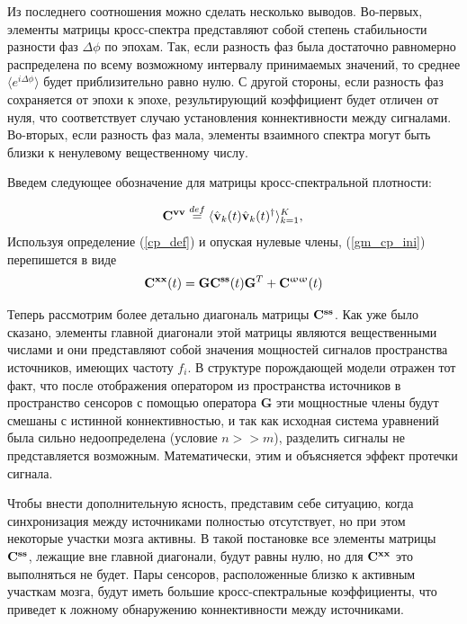 Из последнего соотношения можно сделать несколько выводов.
Во-первых, элементы матрицы кросс-спектра представляют собой степень стабильности
разности фаз $\Delta\phi$ по эпохам.
Так, если разность фаз была достаточно равномерно распределена по всему возможному
интервалу принимаемых значений, то среднее $\langle e^{i\Delta\phi} \rangle$
будет приблизительно равно нулю.
С другой стороны, если разность фаз сохраняется от эпохи к эпохе,
результирующий коэффициент будет отличен от нуля,
что соответствует случаю установления коннективности между сигналами.
Во-вторых, если разность фаз мала,
элементы взаимного спектра могут быть близки к ненулевому вещественному числу.

Введем следующее обозначение для матрицы кросс-спектральной плотности:

\begin{equation}
    \mathbf{C}^{\mathbf{v v}} \stackrel{def}{=} \langle{\hat{\mathbf{v}}_k(t) \hat{\mathbf{v}}_k(t)^{\dag}}\rangle_{k=1}^K, \\
    \label{cp_def}
\end{equation}
Используя определение (\ref{cp_def}) и опуская нулевые члены, (\ref{gm_cp_ini})
перепишется в виде
\begin{equation}
    \mathbf{C}^{\mathbf{x x}}(t) = \mathbf{G} \mathbf{C}^{\mathbf{s s}}(t) \mathbf{G}^T + \mathbf{C}^{\mathbf{\upomega \upomega}}(t)
    \label{gm_cp_matr}
\end{equation}

Теперь рассмотрим более детально диагональ матрицы $\mathbf{C}^{\mathbf{s s}}$.
Как уже было сказано, элементы главной диагонали этой матрицы являются вещественными числами
и они представляют собой значения мощностей сигналов пространства источников,
имеющих частоту $f_i$. В структуре порождающей модели отражен тот факт,
что после отображения оператором из пространства источников в пространство сенсоров
с помощью оператора $\mathbf{G}$ эти мощностные члены будут смешаны с истинной коннективностью,
и так как исходная система уравнений была сильно недоопределена (условие $n >> m$),
разделить сигналы не представляется возможным.
Математически, этим и объясняется эффект протечки сигнала.

Чтобы внести дополнительную ясность, представим себе ситуацию,
когда синхронизация между источниками полностью отсутствует,
но при этом некоторые участки мозга активны.
В такой постановке все элементы матрицы $\mathbf{C}^{\mathbf{s s}}$, лежащие вне главной диагонали,
будут равны нулю, но для $\mathbf{C}^{\mathbf{x x}}$ это выполняться не будет.
Пары сенсоров, расположенные близко к активным участкам мозга,
будут иметь большие кросс-спектральные коэффициенты,
что приведет к ложному обнаружению коннективности между источниками.

